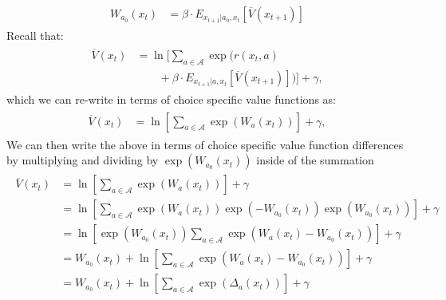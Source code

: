 \documentclass{article}
\begin{document}
\begin{appendix}
\begin{align}
\begin{split}
W_{a_0}(x_t) &= \beta  \cdot E_{x_{t+1}|a_0,x_t} \left[ \overline{V}(x_{t+1}) \right] 
\end{split}
\end{align}
Recall that:
\begin{align} 
\begin{split}
\overline{V}(x_t) &=\ln\bigg[\sum_{a\in\mathcal{A}} \exp\big(r(x_t,a)
\\&\qquad+\beta \cdot E_{x_{t+1}|a,x_t} \left[ \overline{V}(x_{t+1}) \right] \big)\bigg]  +\gamma,
\end{split}
\end{align}
which we can re-write in terms of choice specific value functions as:
\begin{align} 
\begin{split}
\overline{V}(x_t) &=\ln\left[\sum_{a\in\mathcal{A}} \exp\left(W_a(x_t) \right)\right]+\gamma,
\end{split}
\end{align}
We can then write the above in terms of choice specific value function differences by multiplying and dividing by $\exp(W_{a_0}(x_t))$ inside of the summation
\begin{align}
\begin{split}
\overline{V}(x_t) &=\ln\left[\sum_{a\in\mathcal{A}} \exp\left(W_a(x_t) \right)\right]+\gamma
\\&=\ln\left[\sum_{a\in\mathcal{A}} \exp(W_a(x_t))\exp(-W_{a_0}(x_t))\exp(W_{a_0}(x_t))\right]+\gamma
\\&=\ln\left[\exp(W_{a_0}(x_t))\sum_{a\in\mathcal{A}} \exp(W_a(x_t)-W_{a_0}(x_t))\right]+\gamma\\
&=W_{a_0}(x_t)+\ln\left[\sum_{a\in\mathcal{A}} \exp(W_a(x_t)-W_{a_0}(x_t))\right]+\gamma\\
&=W_{a_0}(x_t)+\ln\left[\sum_{a\in\mathcal{A}} \exp(\Delta_a(x_t))\right]+\gamma
\end{split}
\end{align}

\end{appendix}
\end{document}
